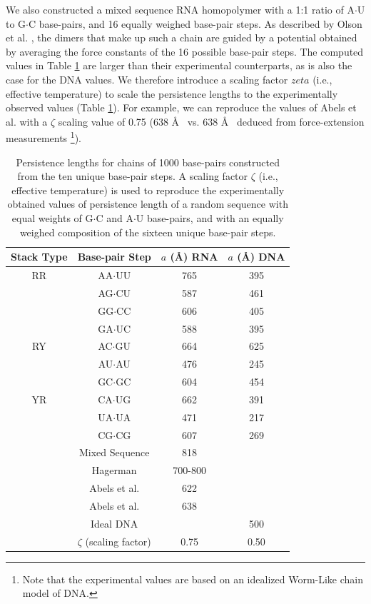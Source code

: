 We also constructed a mixed  sequence RNA homopolymer with a 1:1 ratio
of A$\cdot$U to G$\cdot$C base-pairs, and 16 equally weighed base-pair
steps. As described by Olson et al. \cite{olson2009c}, the dimers that
make up such  a chain are guided by a  potential obtained by averaging
the force constants  of the 16 possible base-pair  steps. The computed
values in  Table \ref{tab:compare} are larger  than their experimental
counterparts, as  is also the case  for the DNA  values.  We therefore
introduce  a scaling  factor $zeta$  (i.e., effective  temperature) to
scale the  persistence lengths  to the experimentally  observed values
(Table \ref{tab:compare}).   For example, we can  reproduce the values
of Abels et  al.\cite{abels2005} with a $\zeta$ scaling  value of 0.75
(638 \AA~ vs.  638 \AA~ deduced from force-extension
measurements \footnote{Note that the  experimental values are based on
  an idealized Worm-Like chain model of DNA.}).

\begin{table}[ht]  
\begin{center}
\begin{tabular}{|c|c|c|c|}
\hline
Stack Type & Base-pair Step & $a$ (\AA) RNA & $a$ (\AA) DNA\\
\hline \hline
RR &  AA$\cdot$UU & 765      &  395   \\
   &  AG$\cdot$CU & 587      &  461   \\
   &  GG$\cdot$CC & 606      &  405   \\
   &  GA$\cdot$UC & 588      &  395   \\
\hline
RY &  AC$\cdot$GU & 664      &  625   \\
   &  AU$\cdot$AU & 476      &  245   \\
   &  GC$\cdot$GC & 604      &  454   \\
\hline
YR &  CA$\cdot$UG & 662      &  391   \\
   &  UA$\cdot$UA & 471      &  217   \\
   &  CG$\cdot$CG & 607      &  269   \\
\hline
   & Mixed Sequence  & 818   &        \\
   & Hagerman   & 700-800    &        \\
   & Abels et al.   & 622    &        \\ 
   & Abels et al.   & 638    &        \\
   & Ideal DNA    &          & 500    \\
   & $\zeta$ (scaling factor)  & 0.75 & 0.50 \\
\hline
\end{tabular}
\caption{Persistence lengths for chains of 1000 base-pairs constructed
  from the ten unique base-pair steps. A scaling factor $\zeta$ (i.e.,
  effective temperature) is used to
  reproduce the experimentally obtained values of persistence length
  of a random sequence with equal weights of G$\cdot$C and A$\cdot$U
  base-pairs, and with an equally weighed composition of the sixteen
  unique base-pair steps.}
\label{tab:compare}
\end{center}
\end{table}

